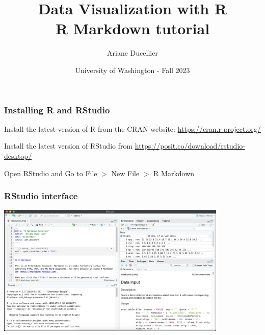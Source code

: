 \documentclass{beamer}
\title[Data Visualization with R - R Markdown tutorial]{Data Visualization with R \\ R Markdown tutorial}
\author{Ariane Ducellier}
\date{University of Washington - Fall 2023}
\begin{document}
	\begin{frame}
		\titlepage
	\end{frame}

	\begin{frame}
		\frametitle{Installing R and RStudio}

		Install the latest version of R from the CRAN website: \href{https://cran.r-project.org/}{https://cran.r-project.org/}

		\vspace{2em}

		Install the latest version of RStudio from \href{https://posit.co/download/rstudio-desktop/}{https://posit.co/download/rstudio-desktop/}

		\vspace{2em}

		Open RStudio and Go to File $>$ New File $>$ R Markdown
		
	\end{frame}

	\begin{frame}
		\frametitle{RStudio interface}

		\centering
		\includegraphics[trim={0cm 0cm 0cm 0cm}, clip, width=11cm]{RMarkdown.png}
		
	\end{frame}
\end{document}
